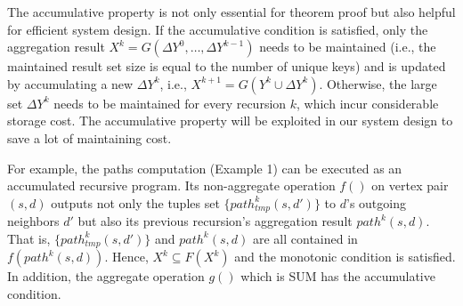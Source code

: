 The accumulative property is not only essential for theorem proof but also helpful for efficient system design. If the accumulative condition is satisfied, only the aggregation result $X^k=G(\Delta Y^{0},\ldots,\Delta Y^{k-1})$ needs to be maintained (i.e., the maintained result set size is equal to the number of unique keys) and is updated by accumulating a new $\Delta Y^{k}$, i.e., $X^{k+1}=G(Y^k \cup \Delta Y^k)$. Otherwise, the large set $\Delta Y^{k}$ needs to be maintained for every recursion $k$, which incur considerable storage cost. The accumulative property will be exploited in our system design to save a lot of maintaining cost.


For example, the paths computation (Example 1) can be executed as an accumulated recursive program. Its non-aggregate operation $f()$ on vertex pair $(s,d)$ outputs not only the tuples set $\{path_{tmp}^k(s,d')\}$ to $d$'s outgoing neighbors $d'$ but also its previous recursion's aggregation result $path^k(s,d)$. That is, $\{path_{tmp}^k(s,d')\}$ and $path^k(s,d)$ are all contained in $f(path^k(s,d))$. Hence, $X^{k}\subseteq F(X^{k})$ and the monotonic condition is satisfied. In addition, the aggregate operation $g()$ which is SUM has the accumulative condition.



